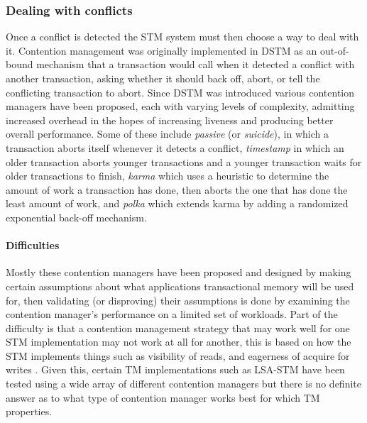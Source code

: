 \subsubsection{Dealing with conflicts}
Once a conflict is detected the STM system must then choose a way to deal with it.
Contention management was originally implemented in DSTM \cite{HLMS03} as an out-of-bound mechanism
that a transaction would call when it detected a conflict with another transaction, 
asking whether it should back off, abort, or tell the conflicting transaction to abort.
Since DSTM was introduced various contention managers have been proposed, each with varying 
levels of complexity, admitting increased overhead in the hopes of increasing liveness and producing better overall performance.
Some of these include \cite{SS04} \emph{passive} (or \emph{suicide}), in which a transaction aborts itself
 whenever it detects a conflict, \emph{timestamp} in which an older transaction aborts younger
 transactions and a younger transaction waits for older transactions to finish, \emph{karma} which
 uses a heuristic to determine the amount of work a transaction has done, then aborts the one that
 has done the least amount of work, and \emph{polka} \cite{1073861} which extends karma by adding a randomized exponential back-off mechanism.

\paragraph{Difficulties}
Mostly these contention managers have been proposed and designed by making certain assumptions about
 what applications transactional memory will be used for, then validating (or disproving) their assumptions is done
by examining the contention manager's performance on a limited set of workloads.
Part of the difficulty is that a contention management strategy that may work well for one STM 
implementation may not work at all for another, this is based on how the STM implements things such as
 visibility of reads, and eagerness of acquire for writes \cite{DGK09}.
Given this, certain TM implementations such as LSA-STM \cite{RFF07} have been tested using a wide array of 
different contention managers  but there is no definite answer as 
to what type of contention manager works best for which TM properties.

